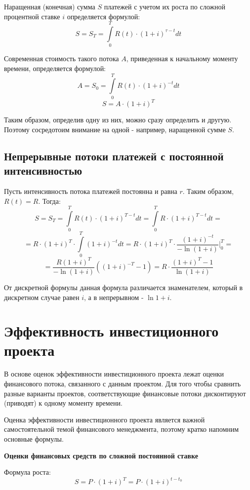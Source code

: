 \documentclass[aps,%
12pt,%
final,%
oneside,
onecolumn,%
musixtex, %
superscriptaddress,%
centertags]{article} %
\theoremstyle{plain}
\theoremstyle{definition}
\theoremstyle{remark}
\begin{document}
Наращенная (конечная) сумма $S$ платежей с учетом их роста по сложной процентной ставке $i$ определяется формулой:
$$S = S_T = \int\limits_0^T R(t) \cdot (1+i)^{\tau - t}dt$$

Современная стоимость такого потока $A$, приведенная к начальному моменту времени, определяется формулой:
$$A = S_0 = \int\limits_0^T R(t) \cdot (1+i)^{-t}dt$$
$$S = A \cdot (1+i)^T$$

Таким образом, определив одну из них, можно сразу определить и другую. Поэтому сосредотоим внимание на одной - например, наращенной сумме $S$.


\subsection{Непрерывные потоки платежей с постоянной интенсивностью}

Пусть интенсивность потока платежей постоянна и равна $r$. Таким образом, $R(t) = R$. Тогда:
$$S = S_T = \int\limits_0^T R(t) \cdot (1+i)^{T - t}dt = \int\limits_0^T R \cdot (1+i)^{T - t}dt = $$
$$ = R \cdot (1+i)^T \cdot \int\limits_0^T (1+i)^{-t} dt = R \cdot (1+i)^T \cdot \frac{(1+i)^{-t}}{-\ln (1+i)} |_0^T = $$
$$ = \frac{R(1+i)^T}{-\ln(1+i)}((1+i)^{-T} - 1) = R \cdot \frac{(1+i)^T-1}{\ln (1+i)}$$

От дискретной формулы данная формула различается знаменателем, который в дискретном случае равен $i$, а в непрерывном - $\ln 1+i$.


\newpage
\section{Эффективность инвестиционного проекта}

В основе оценок эффективности инвестиционного проекта лежат оценки финансового потока, связанного с данным проектом. Для того чтобы сравнить разные варианты проектов, соответствующие финансовые потоки дисконтируют (приводят) к одному моменту времени.

Оценка эффективности инвестиционного проекта является важной самостоятельной темой финансового менеджмента, поэтому кратко напомним основные формулы.

\textbf{Оценки финансовых средств по сложной постоянной ставке}

Формула роста:
$$S = P \cdot (1+i)^T = P \cdot (1+i)^{t-t_0}$$
\end{document}
